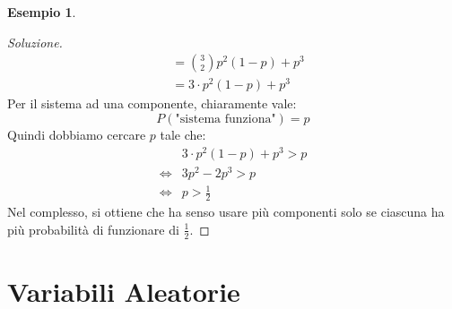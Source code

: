 \documentclass{article}
\theoremstyle{plain}
\theoremstyle{definition}
\newtheorem{esempio}{Esempio}[section]
\theoremstyle{remark}
\newenvironment{soluzione}
	{\renewcommand\qedsymbol{$\mathwitch*$}\begin{proof}[Soluzione]}
	{\end{proof}}
\renewcommand{\qedsymbol}{$\mathrightghost$}
\begin{document}
\begin{esempio}
\begin{soluzione}
\begin{align*}
			&=\binom{3}{2}p^2 (1-p)+p^3\\
			&=3\cdot p^2 (1-p)+p^3
		\end{align*}
		Per il sistema ad una componente, chiaramente vale:
		\begin{equation*}
			P(\text{"sistema funziona"})=p
		\end{equation*}
		Quindi dobbiamo cercare $p$ tale che:
		\begin{align*}
			&3\cdot p^2 (1-p)+p^3>p\\
			\Leftrightarrow&3p^2-2p^3>p\\
			\Leftrightarrow&p>\frac{1}{2}
		\end{align*}
		Nel complesso, si ottiene che ha senso usare più componenti solo se ciascuna ha più probabilità di funzionare di $\frac{1}{2}$.
	\end{soluzione}
\end{esempio}
\section{Variabili Aleatorie} %
\label{sec:variabili_aleatorie}
\end{document}
